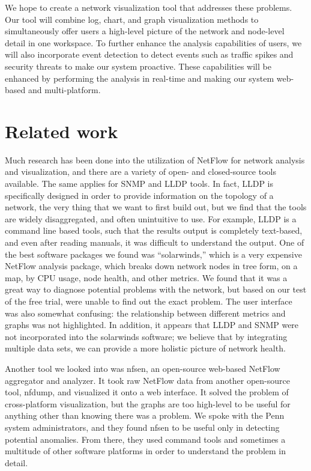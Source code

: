\documentclass{sig-alternate}
\begin{document}
We hope to create a network visualization tool that addresses these problems.
Our tool will combine log, chart, and graph visualization methods to
simultaneously offer users a high-level picture of the network and node-level
detail in one workspace. To further enhance the analysis capabilities of users,
we will also incorporate event detection to detect events such as traffic spikes
and security threats to make our system proactive. These capabilities will be
enhanced by performing the analysis in real-time and making our system web-based
and multi-platform.

\section{Related work}

Much research has been done into the utilization of NetFlow for network analysis
and visualization, and there are a variety of open- and closed-source tools
available. The same applies for SNMP and LLDP tools. In fact, LLDP is
specifically designed in order to provide information on the topology of a
network, the very thing that we want to first build out, but we find that the
tools are widely disaggregated, and often unintuitive to use. For example, LLDP
is a command line based tools, such that the results output is completely
text-based, and even after reading manuals, it was difficult to understand the
output. One of the best software packages we found was ``solarwinds,'' which is
a very expensive NetFlow analysis package, which breaks down network nodes in
tree form, on a map, by CPU usage, node health, and other metrics. We found that
it was a great way to diagnose potential problems with the network, but based on
our test of the free trial, were unable to find out the exact problem. The user
interface was also somewhat confusing: the relationship between different
metrics and graphs was not highlighted. In addition, it appears that LLDP and
SNMP were not incorporated into the solarwinds software; we believe that by
integrating multiple data sets, we can provide a more holistic picture of
network health. 

Another tool we looked into was nfsen, an open-source web-based NetFlow
aggregator and analyzer. It took raw NetFlow data from another open-source tool,
nfdump, and visualized it onto a web interface. It solved the problem of
cross-platform visualization, but the graphs are too high-level to be useful for
anything other than knowing there was a problem. We spoke with the Penn system
administrators, and they found nfsen to be useful only in detecting potential
anomalies. From there, they used command tools and sometimes a multitude of
other software platforms in order to understand the problem in detail.
\end{document}
